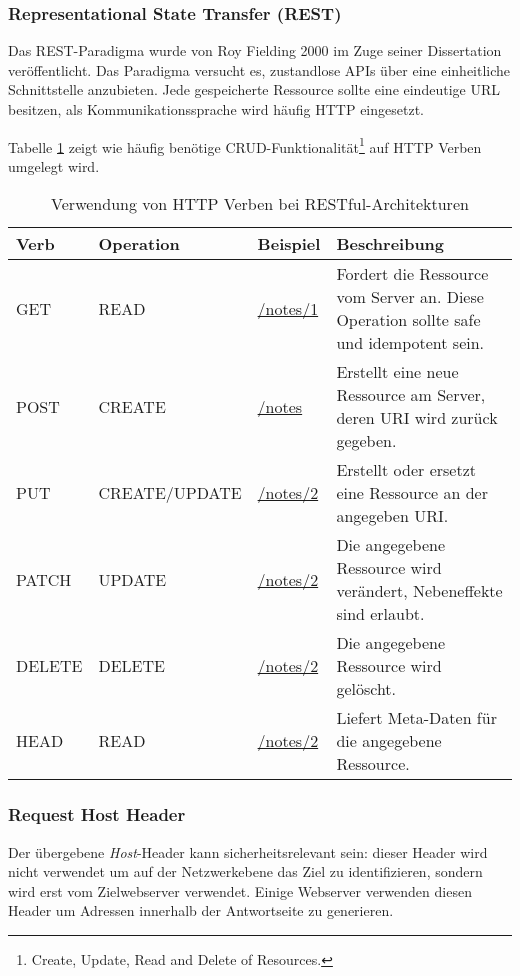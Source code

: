 \subsubsection{Representational State Transfer (REST)}

Das REST-Paradigma wurde von Roy Fielding 2000 im Zuge seiner Dissertation veröffentlicht. Das Paradigma versucht es, zustandlose APIs über eine einheitliche Schnittstelle anzubieten. Jede gespeicherte Ressource sollte eine eindeutige URL besitzen, als Kommunikationssprache wird häufig HTTP eingesetzt.

Tabelle \ref{tbl:rest} zeigt wie häufig benötige CRUD-Funktionalität\footnote{Create, Update, Read and Delete of Resources.} auf HTTP Verben umgelegt wird.

\begin{table}
	\begin{center}
\begin{tabular}{lllp{6cm}}
	\toprule
	Verb & Operation & Beispiel & Beschreibung \\
	\midrule
	GET  & READ & \url{/notes/1} & Fordert die Ressource vom Server an. Diese Operation sollte safe und idempotent sein. \\
	POST & CREATE & \url{/notes} &  Erstellt eine neue Ressource am Server, deren URI wird zurück gegeben.\\
	PUT  & CREATE/UPDATE & \url{/notes/2} & Erstellt oder ersetzt eine Ressource an der angegeben URI.\\
	PATCH & UPDATE & \url{/notes/2} & Die angegebene Ressource wird verändert, Nebeneffekte sind erlaubt. \\
	DELETE & DELETE & \url{/notes/2} & Die angegebene Ressource wird gelöscht. \\
	HEAD & READ & \url{/notes/2} & Liefert Meta-Daten für die angegebene Ressource. \\
	\bottomrule
\end{tabular}
	\caption{Verwendung von HTTP Verben bei RESTful-Architekturen}
	\label{tbl:rest}
\end{center}
\end{table}

\subsubsection{Request Host Header}

Der übergebene \textit{Host}-Header kann sicherheitsrelevant sein: dieser Header wird nicht verwendet um auf der Netzwerkebene das Ziel zu identifizieren, sondern wird erst vom Zielwebserver verwendet. Einige Webserver verwenden diesen Header um Adressen innerhalb der Antwortseite zu generieren.

